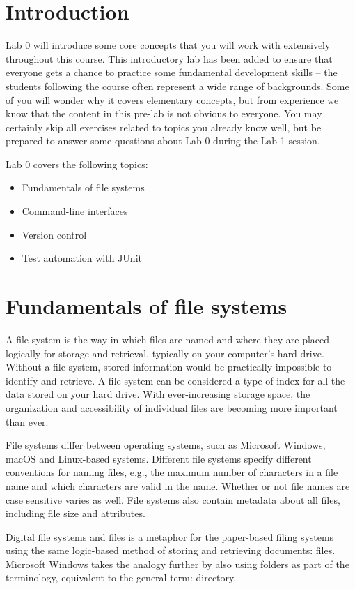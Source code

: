 \documentclass{scrreprt}
\begin{document}
\chapter{Introduction}
Lab 0 will introduce some core concepts that you will work with extensively throughout this course. This introductory lab has been added to ensure that everyone gets a chance to practice some fundamental development skills -- the students following the course often represent a wide range of backgrounds. Some of you will wonder why it covers elementary concepts, but from experience we know that the content in this pre-lab is not obvious to everyone. You may certainly skip all exercises related to topics you already know well, but be prepared to answer some questions about Lab 0 during the Lab 1 session.

Lab 0 covers the following topics:
\begin{itemize}
 \item Fundamentals of file systems
 \item Command-line interfaces
 \item Version control
 \item Test automation with JUnit
\end{itemize} 

\chapter{Fundamentals of file systems}
A file system is the way in which files are named and where they are placed logically for storage and retrieval, typically on your computer's hard drive. Without a file system, stored information would be practically impossible  to identify and retrieve. A file system can be considered a type of index for all the data stored on your hard drive. With ever-increasing storage space, the organization and accessibility of individual files are becoming more important than ever.

File systems differ between operating systems, such as Microsoft Windows, macOS and Linux-based systems. Different file systems specify different conventions for naming files, e.g., the maximum number of characters in a file name and which characters are valid in the name. Whether or not file names are case sensitive varies as well. File systems also contain metadata about all files, including file size and attributes. 

Digital file systems and files is a metaphor for the paper-based filing systems using the same logic-based method of storing and retrieving documents: files. Microsoft Windows takes the analogy further by also using folders as part of the terminology, equivalent to the general term: directory.
\end{document}

